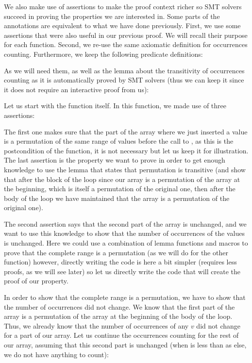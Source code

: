 We also make use of assertions to make the proof context richer so SMT solvers
succeed in proving the properties we are interested in. Some parts of the
annotations are equivalent to what we have done previously. First, we use some
assertions that were also useful in our previous proof. We will recall their
purpose for each function. Second, we re-use the same axiomatic definition for
occurrences counting. Furthermore, we keep the following predicate definitions:




As we will need them, as well as the lemma about the transitivity of
occurrences counting as it is automatically proved by SMT solvers (thus we can
keep it since it does not require an interactive proof from us):




Let us start with the  function itself. In this
function, we made use of three assertions:




The first one makes sure that the part of the array where we just inserted a
value is a permutation of the same range of values before the call to
, as this is the postcondition of the function, it is not
necessary but let us keep it for illustration. The last assertion is the
property we want to prove in order to get enough knowledge to use the lemma that
states that permutation is transitive (and show that after the block of the loop
since our array is a permutation of the array at the beginning, which is itself
a permutation of the original one, then after the body of the loop we have
maintained that the array is a permutation of the original one).



The second assertion says that the second part of the array is unchanged, and we
want to use this knowledge to show that the number of occurrences of the values
is unchanged. Here we could use a combination of lemma functions and macros to
prove that the complete range is a permutation (as we will do for the other
function) however, directly writing the code is here a bit simpler (requires
less proofs, as we will see later) so let us directly write the code that will
create the proof of our property.



In order to show that the complete range is a permutation, we have to show that
the number of occurrences did not change. We know that the first part of the
array is a permutation of the array at the beginning of the body of the loop.
Thus, we already know that the number of occurrences of any $v$ did not change
for a part of our array. Let us continue the occurrences counting for the rest
of our array, assuming that this second part is unchanged (when 
is less than  as else, we do not have anything to count):


